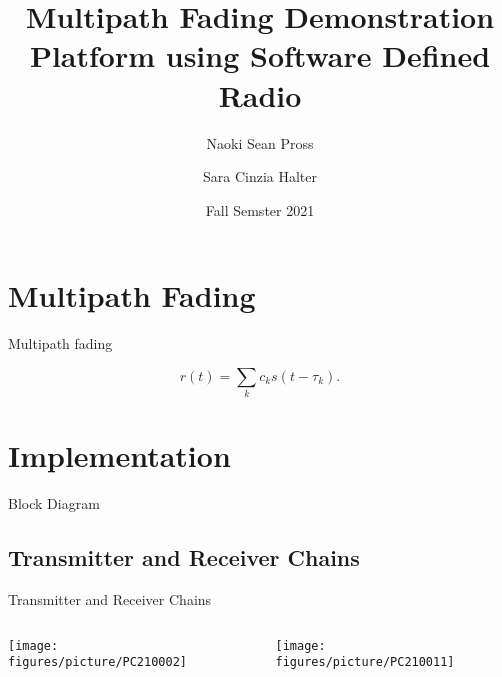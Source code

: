 \documentclass[xetex, onlymath, handout]{beamer}
\title{Multipath Fading Demonstration Platform using Software Defined Radio}
\author{Naoki Sean Pross \and Sara Cinzia Halter}
\date{Fall Semster 2021}
\institute[OST]{OST FHO Campus Rapperswil}
\begin{document}
\frame{
  \maketitle
}

\section{Multipath Fading}

\begin{frame}{Multipath fading}
	\begin{figure}
		\centering
		
	\end{figure}
  \vspace{\baselineskip}
  \[
    r(t) = \sum_k c_k s(t - \tau_k).
  \]
\end{frame}



\section{Implementation}

\begin{frame}{Block Diagram}
	\begin{figure}
		\centering
		\resizebox{.9\linewidth}{!}{
			
		}
		
	\end{figure}
\end{frame}
	
\subsection{Transmitter and Receiver Chains}

\begin{frame}{Transmitter and Receiver Chains}
	\begin{columns}
		    \begin{column}{.5\linewidth}
		    \centering
		     \texttt{[image: figures/picture/PC210002]}
		    \end{column}
		    \begin{column}{.5\linewidth}
		      \begin{figure}
		      	\centering
		        \texttt{[image: figures/picture/PC210011]}
		      \end{figure}
		    \end{column}
	 \end{columns}
\end{frame}
\end{document}
